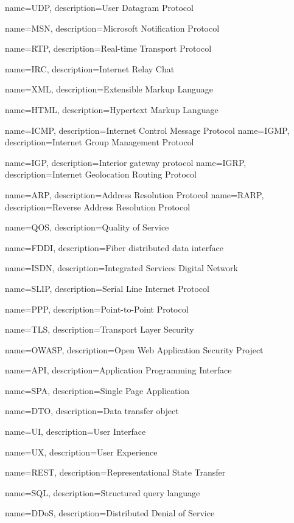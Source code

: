 {
    name=UDP,
    description={User Datagram Protocol}
}

{
    name=MSN,
    description={Microsoft Notification Protocol}
}

{
    name=RTP,
    description={Real-time Transport Protocol}
}

{
    name=IRC,
    description={Internet Relay Chat}
}

{
    name=XML,
    description={Extensible Markup Language}
}

{
    name=HTML,
    description={Hypertext Markup Language}
}

{
    name=ICMP,
    description={Internet Control Message Protocol}
}
{
    name=IGMP,
    description={Internet Group Management Protocol}
}

{
    name=IGP,
    description={Interior gateway protocol}
}
{
    name=IGRP,
    description={Internet Geolocation Routing Protocol}
}


{
    name=ARP,
    description={Address Resolution Protocol}
}
{
    name=RARP,
    description={Reverse Address Resolution Protocol}
}

{
    name=QOS,
    description={Quality of Service}
}

{
    name=FDDI,
    description={Fiber distributed data interface}
}

{
    name=ISDN,
    description={Integrated Services Digital Network}
}

{
    name=SLIP,
    description={Serial Line Internet Protocol}
}

{
    name=PPP,
    description={Point-to-Point Protocol }
}

{
    name=TLS,
    description={Transport Layer Security}
}

{
    name=OWASP,
    description={Open Web Application Security Project}
}

{
    name=API,
    description={Application Programming Interface}
}

{
    name=SPA,
    description={Single Page Application}
}

{
    name=DTO,
    description={Data transfer object}
}

{
    name=UI,
    description={User Interface}
}

{
    name=UX,
    description={User Experience}
}

{
    name=REST,
    description={Representational State Transfer}
}

{
    name=SQL,
    description={Structured query language}
}

{
    name=DDoS,
    description={Distributed Denial of Service}
}